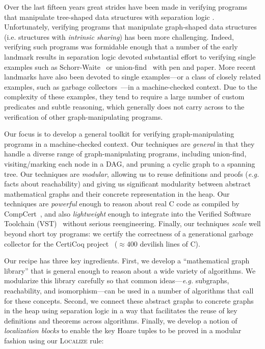 Over the last fifteen years great strides have been made in verifying programs that manipulate
tree-shaped data structures with separation logic
\cite{berdine:smallfoot,chin:hipsleek,jacobs:verifast,chlipala:bedrock,bengtson:charge,appel:programlogics}.  Unfortunately, verifying programs that manipulate graph-shaped data structures (i.e. structures with \emph{intrinsic sharing}) has been more challenging.  Indeed, verifying such programs was formidable enough that a number of the early landmark results in separation logic devoted substantial effort to verifying single examples such as Schorr-Waite~\cite{hongseok:phd} or union-find~\cite{NeelThesis} with pen and paper.  More recent landmarks have also been devoted to single examples---or a class of closely related examples, such as garbage collectors~\cite{A,CakeMLGC,C}---in a machine-checked context.
Due to the complexity of these examples, they tend to require a large number of custom predicates and subtle reasoning, which generally does not carry across to the verification of other graph-manipulating programs.

Our focus is to develop a general toolkit for verifying graph-manipulating programs in a machine-checked context. Our techniques are \emph{general} in that they handle a diverse range of graph-manipulating programs, including union-find, visiting/marking each node in a DAG, and pruning a cyclic graph to a spanning tree.
Our techniques are \emph{modular}, allowing us to reuse definitions and proofs 
(\emph{e.g.} facts about reachability) and giving us {\color{magenta} significant modularity} between abstract mathematical graphs and their concrete representation in the heap.
Our techniques are \emph{powerful} enough to reason about real C code as compiled by CompCert~\cite{blah}, and also \emph{lightweight} enough to integrate into the Verified Software Toolchain (VST)~\cite{appel:programlogics} without serious reengineering.
Finally, our techniques \emph{scale} well beyond short toy programs: we certify the correctness of a generational garbage collector for the CertiCoq project~\cite{blah} ($\approx400$ devilish lines of C).

Our recipe has three key ingredients.  First, we develop a ``mathematical graph library'' that is general enough to reason about a wide variety of algorithms.  We modularize this library carefully so that common ideas---\emph{e.g.} subgraphs, reachability, and isomorphism---can be used in a number of algorithms that call for these concepts.  Second, we connect these abstract graphs to
concrete graphs in the heap using separation logic in a way that facilitates the reuse of key definitions and theorems across algorithms.  Finally, we develop a notion of \emph{localization blocks} to
enable the key Hoare tuples to be proved in a modular fashion using our \textsc{Localize} rule:

